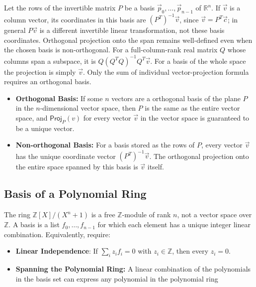  Let the rows of the invertible matrix $P$ be a basis $\vec p_0,\ldots,\vec p_{n-1}$ of $\mathbb R^n$. If $\vec v$ is a column vector, its coordinates in this basis are $(P^T)^{-1}\vec v$, since $\vec v=P^T\vec c$; in general $P\vec v$ is a different invertible linear transformation, not these basis coordinates. Orthogonal projection onto the span remains well-defined even when the chosen basis is non-orthogonal. For a full-column-rank real matrix $Q$ whose columns span a subspace, it is $Q(Q^TQ)^{-1}Q^T\vec v$. For a basis of the whole space the projection is simply $\vec v$. Only the sum of individual vector-projection formula requires an orthogonal basis.

\begin{tcolorbox}[title={\textbf{\tboxtheorem{\ref*{subsec:projection}} Uniqueness of Transformed Vectors}}]

\begin{itemize}
\item  \textbf{Orthogonal Basis:} If some $n$ vectors are a orthogonal basis of the plane $P$ in the $n$-dimensional vector space, then $P$ is the same as the entire vector space, and $\textsf{Proj}_P(v)$ for every vector $\vec{v}$ in the vector space is guaranteed to be a unique vector.
\item \textbf{Non-orthogonal Basis:} For a basis stored as the rows of $P$, every vector $\vec v$ has the unique coordinate vector $(P^T)^{-1}\vec v$. The orthogonal projection onto the entire space spanned by this basis is $\vec v$ itself.
\end{itemize}
\end{tcolorbox}




\subsection{Basis of a Polynomial Ring}
\label{subsec:polynomial-ring-basis}

The ring $\mathbb Z[X]/(X^n+1)$ is a free $\mathbb Z$-module of rank $n$, not a vector space over $\mathbb Z$. A basis is a list $f_0,\ldots,f_{n-1}$ for which each element has a unique integer linear combination. Equivalently, require:

\begin{itemize}

\item \textbf{Linear Independence}: If $\sum_i z_i f_i=0$ with $z_i\in\mathbb Z$, then every $z_i=0$.
\item \textbf{Spanning the Polynomial Ring:} A linear combination of the polynomials in the basis set can express any polynomial in the polynomial ring
\end{itemize}

